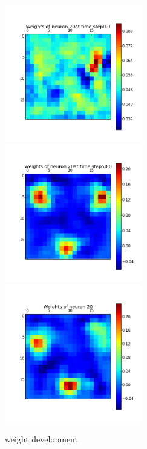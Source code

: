 \documentclass[a4paper, 12pt]{article}
\begin{document}
\begin{figure}[htbp]
\begin{minipage}[hbt]{0,49\textwidth}
        \centering
\includegraphics[width=6cm,height=6cm]{neurons/neuron_w_20_t_0.png}\\[10pt]
\includegraphics[width=6cm,height=6cm]{neurons/neuron_w_20_t_50.png} \\[10pt]
\includegraphics[width=6cm,height=6cm]{neurons/neuron_w_20.png}
        \caption{weight development}
        \label{LabelA}
\end{minipage}
\begin{minipage}[hbt]{0,49\textwidth}

\end{minipage}
\end{figure}
\end{document}
